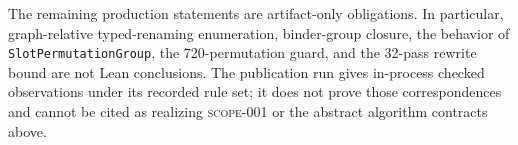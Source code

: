 The remaining production statements are artifact-only obligations.  In
particular, graph-relative typed-renaming enumeration, binder-group closure,
the behavior of \texttt{SlotPermutationGroup}, the 720-permutation guard, and
the 32-pass rewrite bound are not Lean conclusions.  The publication run gives
in-process checked observations under its recorded rule set; it does not prove
those correspondences and cannot be cited as realizing \textsc{scope-001} or
the abstract algorithm contracts above.

